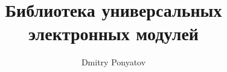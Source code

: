 




\title{Библиотека универсальных\\электронных модулей \odurino}

\author{Dmitry Ponyatov }





\tableofcontents




